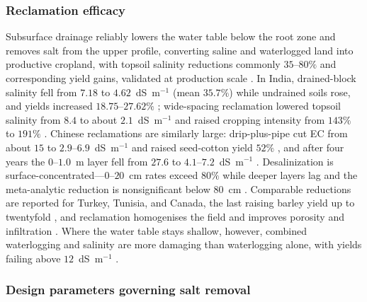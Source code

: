 \documentclass[11pt]{article}
\begin{document}
\subsubsection{Reclamation efficacy}

Subsurface drainage reliably lowers the water table below the root zone and
removes salt from the upper profile, converting saline and waterlogged land into
productive cropland, with topsoil salinity reductions commonly $35$--$80\%$ and
corresponding yield gains, validated at production scale
\parencite{Yang2025,Derby2024}. In India, drained-block salinity fell from
$7.18$ to $4.62$~dS~m$^{-1}$ (mean $35.7\%$) while undrained soils rose, and
yields increased $18.75$--$27.62\%$ \parencite{Sharma2006}; wide-spacing
reclamation lowered topsoil salinity from $8.4$ to about $2.1$~dS~m$^{-1}$ and
raised cropping intensity from $143\%$ to $191\%$ \parencite{Manjunatha2004}.
Chinese reclamations are similarly large: drip-plus-pipe cut EC from about
$15$ to $2.9$--$6.9$~dS~m$^{-1}$ and raised seed-cotton yield $52\%$
\parencite{Heng2021}, and after four years the $0$--$1.0$~m layer fell from
$27.6$ to $4.1$--$7.2$~dS~m$^{-1}$ \parencite{Zhang2021}. Desalinization
is surface-concentrated---$0$--$20$~cm rates exceed $80\%$ while deeper layers
lag and the meta-analytic reduction is nonsignificant below $80$~cm
\parencite{Han2023,Yang2025}. Comparable reductions are reported for Turkey,
Tunisia, and Canada, the last raising barley yield up to twentyfold
\parencite{Bahçeci2009,HajAmor2019,Steppuhn2006,Steppuhn2017}, and reclamation
homogenises the field and improves porosity and infiltration
\parencite{Yu2015,Yu2025,Sharma2000}. Where the water table stays shallow,
however, combined waterlogging and salinity are more damaging than waterlogging
alone, with yields failing above $12$~dS~m$^{-1}$ \parencite{Kahlown2002}.

\subsubsection{Design parameters governing salt removal}
\end{document}
